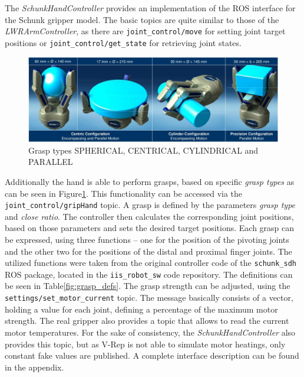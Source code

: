 The \emph{SchunkHandController} provides an implementation of the ROS interface for the Schunk gripper model. The basic topics are quite similar to those of the \emph{LWRArmController}, as there are \texttt{joint\_control/move} for setting joint target positions or \texttt{joint\_control/get\_state} for retrieving joint states.
\begin{figure}[h]
	\centering
  	\includegraphics[width=1.0\textwidth]{images/grasp_types.jpg}
	\caption{Grasp types SPHERICAL, CENTRICAL, CYLINDRICAL and PARALLEL}
	\label{fig:grasp_types}
\end{figure}
Additionally the hand is able to perform grasps, based on specific \emph{grasp types} as can be seen in Figure\ref{fig:grasp_types}. This functionality can be accessed via the \texttt{joint\_control/gripHand} topic. A grasp is defined by the parameters \emph{grasp type} and \emph{close ratio}. The controller then calculates the corresponding joint positions, based on those parameters and sets the desired target positions. Each grasp can be expressed, using three functions -- one for the position of the pivoting joints and the other two for the positions of the distal and proximal finger joints. The utilized functions were taken from the original controller code of the \texttt{schunk\_sdh} ROS package, located in the \texttt{iis\_robot\_sw} code repository. The definitions can be seen in Table\ref{fig:grasp_defs}. The grasp strength can be adjusted, using the \texttt{settings/set\_motor\_current} topic. The message basically consists of a vector, holding a value for each joint, defining a percentage of the maximum motor strength. The real gripper also provides a topic that allows to read the current motor temperatures. For the sake of consistency, the \emph{SchunkHandController} also provides this topic, but as V-Rep is not able to simulate motor heatings, only constant fake values are published. A complete interface description can be found in the appendix.

